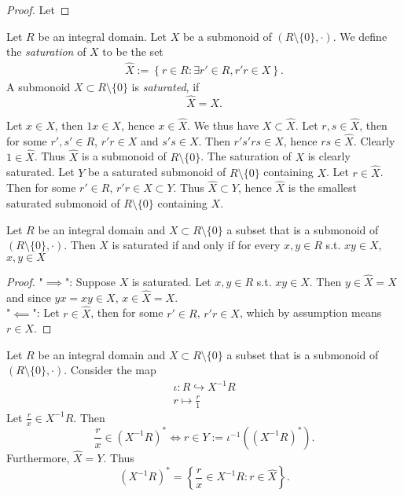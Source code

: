 \begin{proof}
    Let 
\end{proof}
\begin{definition}
    Let $R$ be an integral domain. Let $X$ be a submonoid of $(R\setminus \{0\}, \cdot)$. We define the \textit{saturation} of $X$ to be the set
    \begin{align*}
        \widehat{X} := \left\{ r\in R : \exists r'\in R, r'r \in X \right\}.
    \end{align*}
    A submonoid $X \subset R\setminus \{0\}$ is \textit{saturated}, if 
    $$\widehat{X} = X.$$
\end{definition}
\begin{remark}
    Let $x\in X$, then $1x\in X$, hence $x\in \widehat{X}$. We thus have $X\subset \widehat{X}$. Let $r,s\in \widehat{X}$, then for some $r',s'\in R$, $r'r\in X$ and $s's\in X$. Then $r's'rs\in X$, hence $rs \in \widehat{X}$. Clearly $1\in \widehat{X}$. Thus $\widehat{X}$ is a submonoid of $R\setminus\{0\}$. The saturation of $X$ is clearly saturated. Let $Y$ be a saturated submonoid of $R\setminus \{0\}$ containing $X$. Let $r \in \widehat{X}$. Then for some $r'\in R$, $r'r\in X\subset Y$. Thus $\widehat{X}\subset Y$, hence $\widehat{X}$ is the smallest saturated submonoid of $R\setminus\{0\}$ containing $X$.
\end{remark}
\begin{lemma}
    Let $R$ be an integral domain and $X\subset R\setminus \{0\}$ a subset that is a submonoid of $(R\setminus \{0\},\cdot)$. Then $X$ is saturated if and only if for every $x,y\in R$ s.t. $xy \in X$, $x,y\in X$
\end{lemma}
\begin{proof}
    "$\implies$": Suppose $X$ is saturated. Let $x,y\in R$ s.t. $xy\in X$. Then $y\in \widehat{X}=X$ and since $yx = xy \in X$, $x\in \widehat{X} = X$.\\
    "$\impliedby$": Let $r\in \widehat{X}$, then for some $r'\in R$, $r'r\in X$, which by assumption means $r\in X$. 
\end{proof}
\begin{lemma}\label{UnitsOfLocalization}
     Let $R$ be an integral domain and $X\subset R\setminus \{0\}$ a subset that is a submonoid of $(R\setminus \{0\},\cdot)$. Consider the map 
     \begin{gather*}
         \iota : R \hookrightarrow X^{-1}R\\
         r \mapsto \frac{r}{1}
     \end{gather*}
     Let $\frac{r}{x}\in X^{-1}R$. Then 
     $$\frac{r}{x}\in \left(X^{-1}R\right)^\ast \iff r \in Y:= \iota^{-1}\left(\left(X^{-1}R\right)^\ast\right).$$
     Furthermore, $\widehat{X} = Y$. Thus 
     $$\left( X^{-1}R \right)^\ast = \left\{ \frac{r}{x}\in X^{-1}R : r \in \widehat{X}\right\}.$$
\end{lemma}
